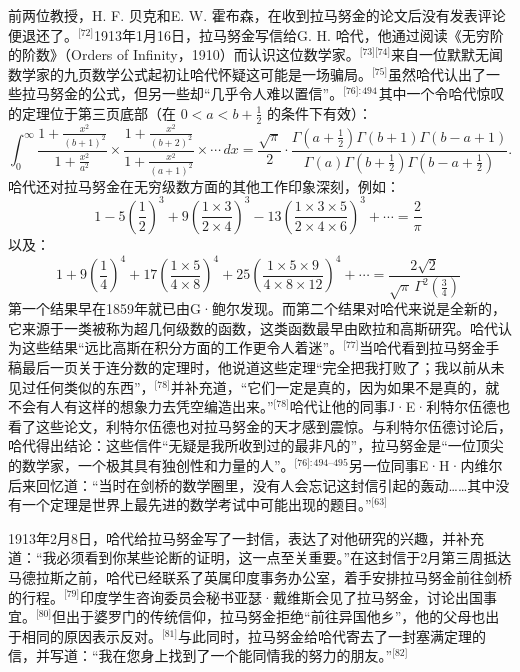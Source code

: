 前两位教授，H. F. 贝克和E. W. 霍布森，在收到拉马努金的论文后没有发表评论便退还了。\(^\text{[72]}\)1913年1月16日，拉马努金写信给G. H. 哈代，他通过阅读《无穷阶的阶数》（Orders of Infinity，1910）而认识这位数学家。\(^\text{[73][74]}\)来自一位默默无闻数学家的九页数学公式起初让哈代怀疑这可能是一场骗局。\(^\text{[75]}\)虽然哈代认出了一些拉马努金的公式，但另一些却“几乎令人难以置信”。\(^\text{[76]: 494 }\)其中一个令哈代惊叹的定理位于第三页底部（在 $0 < a < b + \frac{1}{2}$ 的条件下有效）：
$$
\int_0^{\infty} 
\frac{1 + \frac{x^2}{(b+1)^2}}{1 + \frac{x^2}{a^2}} 
\times \frac{1 + \frac{x^2}{(b+2)^2}}{1 + \frac{x^2}{(a+1)^2}} 
\times \cdots \, dx = \frac{\sqrt{\pi}}{2} \cdot 
\frac{ \Gamma\left(a + \frac{1}{2}\right) \Gamma(b + 1) \Gamma(b - a + 1) }{ 
\Gamma(a) \Gamma\left(b + \frac{1}{2}\right) \Gamma\left(b - a + \frac{1}{2}\right) }.~
$$
哈代还对拉马努金在无穷级数方面的其他工作印象深刻，例如：
$$
1 - 5\left(\frac{1}{2}\right)^3 + 9\left(\frac{1 \times 3}{2 \times 4}\right)^3 - 13\left(\frac{1 \times 3 \times 5}{2 \times 4 \times 6}\right)^3 + \cdots = \frac{2}{\pi}~
$$
以及：
$$
1 + 9\left(\frac{1}{4}\right)^4 + 17\left(\frac{1 \times 5}{4 \times 8}\right)^4 + 25\left(\frac{1 \times 5 \times 9}{4 \times 8 \times 12}\right)^4 + \cdots = \frac{2\sqrt{2}}{\sqrt{\pi}\, \Gamma^2\left(\frac{3}{4}\right)}~
$$
第一个结果早在1859年就已由G·鲍尔发现。而第二个结果对哈代来说是全新的，它来源于一类被称为超几何级数的函数，这类函数最早由欧拉和高斯研究。哈代认为这些结果“远比高斯在积分方面的工作更令人着迷”。\(^\text{[77]}\)当哈代看到拉马努金手稿最后一页关于连分数的定理时，他说道这些定理“完全把我打败了；我以前从未见过任何类似的东西”，\(^\text{[78]}\)并补充道，“它们一定是真的，因为如果不是真的，就不会有人有这样的想象力去凭空编造出来。”\(^\text{[78]}\)哈代让他的同事J·E·利特尔伍德也看了这些论文，利特尔伍德也对拉马努金的天才感到震惊。与利特尔伍德讨论后，哈代得出结论：这些信件“无疑是我所收到过的最非凡的”，拉马努金是“一位顶尖的数学家，一个极其具有独创性和力量的人”。\(^\text{[76]: 494–495}\)另一位同事E·H·内维尔后来回忆道：“当时在剑桥的数学圈里，没有人会忘记这封信引起的轰动……其中没有一个定理是世界上最先进的数学考试中可能出现的题目。”\(^\text{[63]}\)

1913年2月8日，哈代给拉马努金写了一封信，表达了对他研究的兴趣，并补充道：“我必须看到你某些论断的证明，这一点至关重要。”在这封信于2月第三周抵达马德拉斯之前，哈代已经联系了英属印度事务办公室，着手安排拉马努金前往剑桥的行程。\(^\text{[79]}\)印度学生咨询委员会秘书亚瑟·戴维斯会见了拉马努金，讨论出国事宜。\(^\text{[80]}\)但出于婆罗门的传统信仰，拉马努金拒绝“前往异国他乡”，他的父母也出于相同的原因表示反对。\(^\text{[81]}\)与此同时，拉马努金给哈代寄去了一封塞满定理的信，并写道：“我在您身上找到了一个能同情我的努力的朋友。”\(^\text{[82]}\)

